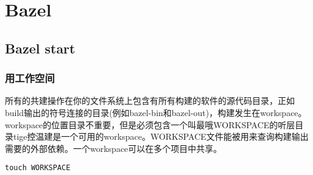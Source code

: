 \chapter{Bazel}
\section{Bazel start}
\subsection{用工作空间}
所有的共建操作在你的文件系统上包含有所有构建的软件的源代码目录，正如build输出的符号连接的目录(例如bazel-bin和bazel-out)，构建发生在workspace。workspace的位置目录不重要，但是必须包含一个叫最哦WORKSPACE的听层目录tige控温建是一个可用的workspace。WORKSPACE文件能被用来查询构建输出需要的外部依赖。一个workspace可以在多个项目中共享。
\begin{lstlisting}[frame =shadowbox ]
touch WORKSPACE
\end{lstlisting}
